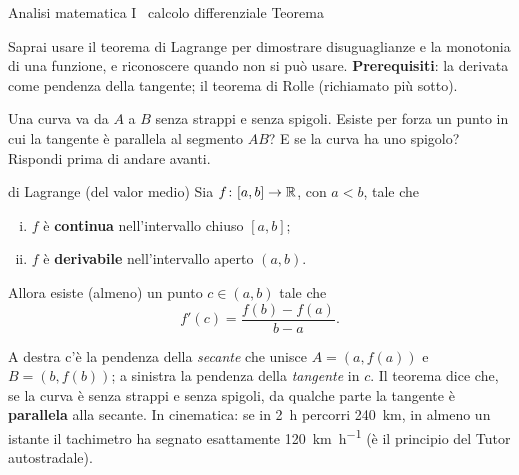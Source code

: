 \documentclass[10pt]{article}
\begin{document}
           {Analisi matematica I \textperiodcentered\ calcolo differenziale}
           {Teorema}

\begin{obiettivi}
Saprai usare il teorema di Lagrange per dimostrare disuguaglianze e la monotonia di una funzione, e riconoscere
quando non si può usare. \textbf{Prerequisiti}: la derivata come pendenza della tangente; il teorema di Rolle
(richiamato più sotto).
\end{obiettivi}

\begin{previsione}
Una curva va da $A$ a $B$ senza strappi e senza spigoli. Esiste per forza un punto in cui la tangente è
parallela al segmento $AB$? E se la curva ha uno spigolo? Rispondi prima di andare avanti.
\end{previsione}

\begin{teorema}{di Lagrange (del valor medio)}
Sia $f\colon [a, b] \to \mathbb{R}$, con $a < b$, tale che
\begin{enumerate}[(i)]
  \item $f$ è \textbf{continua} nell'intervallo chiuso $[a, b]$;
  \item $f$ è \textbf{derivabile} nell'intervallo aperto $(a, b)$.
\end{enumerate}
Allora esiste (almeno) un punto $c \in (a, b)$ tale che
\[
  f'(c) = \frac{f(b) - f(a)}{b - a}.
\]
\end{teorema}

\begin{idea}
A destra c'è la pendenza della \emph{secante} che unisce $A = (a, f(a))$ e $B = (b, f(b))$; a sinistra
la pendenza della \emph{tangente} in $c$. Il teorema dice che, se la curva è \guillemotleft senza strappi\guillemotright{}
e \guillemotleft senza spigoli\guillemotright, da qualche parte la tangente è \textbf{parallela} alla secante.
In cinematica: se in \qty{2}{\hour} percorri \qty{240}{\kilo\metre}, in almeno un istante il tachimetro ha segnato
esattamente \qty{120}{\kilo\metre\per\hour} (è il principio del Tutor autostradale).
\end{idea}
\end{document}
